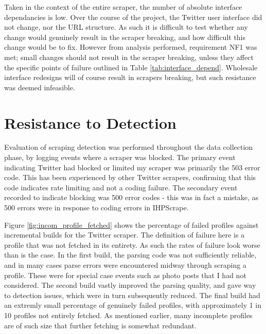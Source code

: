 Taken in the context of the entire scraper, the number of absolute interface dependancies is low. Over the course of the project, the Twitter user interface did not change, nor the URL structure. As such it is difficult to test whether any change would genuinely result in the scraper breaking, and how difficult this change would be to fix. However from analysis performed, requirement NF1 was met; small changes should not result in the scraper breaking, unless they affect the specific points of failure outlined in Table \ref{tab:interface_depend}. Wholesale interface redesigns will of course result in scrapers breaking, but such resistance was deemed infeasible. %

\section{Resistance to Detection}

Evaluation of scraping detection was performed throughout the data collection phase, by logging events where a scraper was blocked. The primary event indicating Twitter had blocked or limited my scraper was primarily the 503 error code. This has been experienced by other Twitter scrapers, confirming that this code indicates rate limiting and not a coding failure. The secondary event recorded to indicate blocking was 500 error codes - this was in fact a mistake, as 500 errors were in response to coding errors in IHPScrape.

Figure \ref{fig:incom_profile_fetched} shows the percentage of failed profiles against incremental builds for the Twitter scraper. The definition of failure here is a profile that was not fetched in its entirety. As such the rates of failure look worse than is the case. In the first build, the parsing code was not sufficiently reliable, and in many cases parse errors were encountered midway through scraping a profile. These were for special case events such as photo posts that I had not considered. The second build vastly improved the parsing quality, and gave way to detection issues, which were in turn subsequently reduced. The final build had an extremly small percentage of genuinely failed profiles, with approximately 1 in 10 profiles not entirely fetched. As mentioned earlier, many incomplete profiles are of such size that further fetching is somewhat redundant. 

